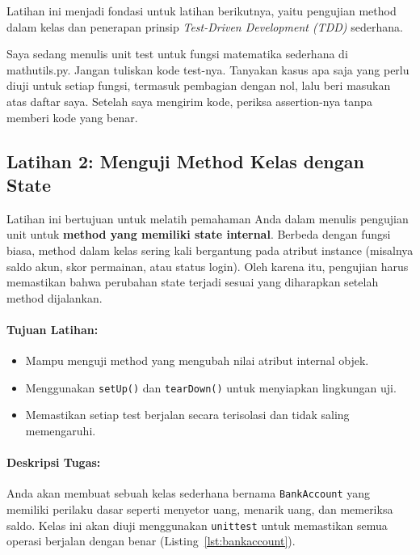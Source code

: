 Latihan ini menjadi fondasi untuk latihan berikutnya, yaitu pengujian method dalam kelas dan penerapan prinsip \textit{Test-Driven Development (TDD)} sederhana.

\begin{promptterarah}
Saya sedang menulis unit test untuk fungsi matematika sederhana di mathutils.py. Jangan tuliskan kode test-nya. Tanyakan kasus apa saja yang perlu diuji untuk setiap fungsi, termasuk pembagian dengan nol, lalu beri masukan atas daftar saya. Setelah saya mengirim kode, periksa assertion-nya tanpa memberi kode yang benar.
\end{promptterarah}



\subsection*{Latihan 2: Menguji Method Kelas dengan State}

Latihan ini bertujuan untuk melatih pemahaman Anda dalam menulis pengujian unit untuk \textbf{method yang memiliki state internal}.  
Berbeda dengan fungsi biasa, method dalam kelas sering kali bergantung pada atribut instance (misalnya saldo akun, skor permainan, atau status login).  
Oleh karena itu, pengujian harus memastikan bahwa perubahan state terjadi sesuai yang diharapkan setelah method dijalankan.

\paragraph{Tujuan Latihan:}
\begin{itemize}
    \item Mampu menguji method yang mengubah nilai atribut internal objek.
    \item Menggunakan \texttt{setUp()} dan \texttt{tearDown()} untuk menyiapkan lingkungan uji.
    \item Memastikan setiap test berjalan secara terisolasi dan tidak saling memengaruhi.
\end{itemize}

\paragraph{Deskripsi Tugas:}

Anda akan membuat sebuah kelas sederhana bernama \texttt{BankAccount} yang memiliki perilaku dasar seperti menyetor uang, menarik uang, dan memeriksa saldo.  
Kelas ini akan diuji menggunakan \texttt{unittest} untuk memastikan semua operasi berjalan dengan benar (Listing~\ref{lst:bankaccount}).

